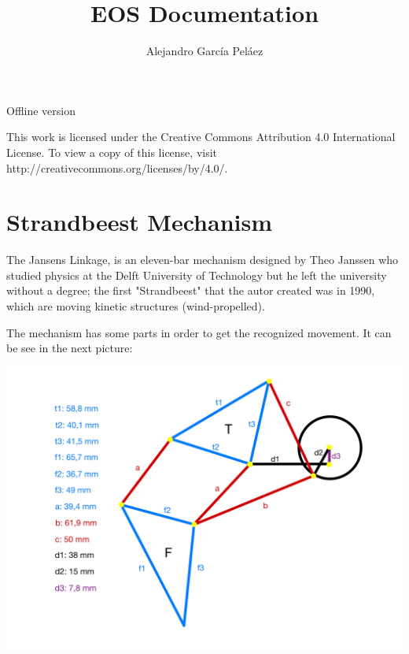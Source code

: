 \documentclass[13pt,a4paper]{article}
\author{Alejandro García Peláez}
\title{EOS Documentation}
\begin{document}
\maketitle 
\begin{center}
Offline version
\end{center}

\break

\vspace*{7cm}
\noindent\begin{flushleft}
 \footnotesize{This work is licensed under the Creative Commons Attribution 4.0 International License. \newline To view a copy of this license, visit http://creativecommons.org/licenses/by/4.0/.}
\end{flushleft}

\break

\vspace*{-3cm}
\section*{Strandbeest Mechanism}

The Jansens Linkage, is an eleven-bar mechanism designed by Theo Janssen who studied physics at the Delft University of Technology but he left the university without a degree; the first "Strandbeest" that the autor created was in 1990, which are moving kinetic structures (wind-propelled).

\noindent\newline The mechanism has some parts in order to get the recognized movement. It can be see in the next picture: \newline \newline

\includegraphics[scale=0.1]{"project_pictures/measures.jpg"}
\end{document}
